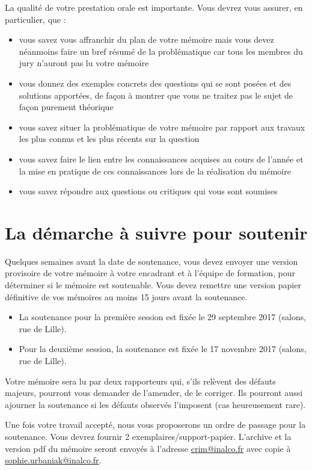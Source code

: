 La qualité de votre prestation orale est importante. Vous devrez vous assurer, en particulier, que :
%
\begin{itemize}
\item vous savez vous affranchir du plan de votre mémoire mais vous devez néanmoins faire un bref résumé de la problématique car tous les membres du jury n'auront pas lu votre mémoire
\item vous donnez des exemples concrets des questions qui se sont posées et des solutions apportées, de façon à montrer que vous ne traitez pas le sujet de façon purement théorique
\item vous savez situer la problématique de votre mémoire par rapport aux travaux les plus connus et les plus récents sur la question
\item vous savez faire le lien entre les connaissances acquises au cours de l'année et la mise en pratique de ces connaissances lors de la réalisation du mémoire
\item vous savez répondre aux questions ou critiques qui vous sont soumises
\end{itemize}

\section{La démarche à suivre pour soutenir}
Quelques semaines avant la date de soutenance, vous devez envoyer une version provisoire de votre mémoire à votre encadrant et à l'équipe de formation, pour déterminer si le mémoire est soutenable. Vous devez remettre une version papier définitive de vos mémoires au moins 15 jours avant la soutenance.
\begin{itemize}
\item La soutenance pour la première session est fixée le 29 septembre 2017 (salons, rue de Lille).
\item Pour la deuxième session, la soutenance est fixée le 17 novembre 2017 (salons, rue de Lille).
\end{itemize}

Votre mémoire sera lu par deux rapporteurs qui, s'ils relèvent des défauts majeurs, pourront vous demander de l'amender, de le corriger. Ils pourront aussi ajourner la soutenance si les défauts observés l'imposent (cas heureusement rare).


Une fois votre travail accepté, nous vous proposerons un ordre de passage pour la soutenance. Vous devrez fournir 2 exemplaires/support-papier. L'archive et la version pdf du mémoire seront envoyés à l'adresse \url{crim@inalco.fr} avec copie à \url{sophie.urbaniak@inalco.fr}.
